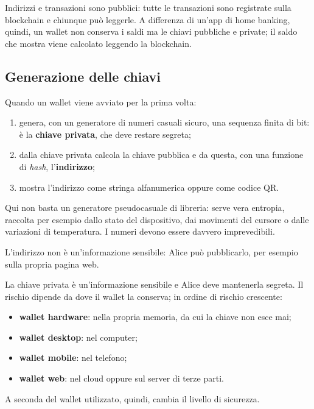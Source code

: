 \documentclass[a4paper, 11pt, oneside]{book}
\begin{document}
	Indirizzi e transazioni sono pubblici: tutte le transazioni sono registrate sulla
	blockchain e chiunque può leggerle. A differenza di un'app di home banking, quindi,
	un wallet non conserva i saldi ma le chiavi pubbliche e private; il saldo che mostra
	viene calcolato leggendo la blockchain.

	\subsection{Generazione delle chiavi}
	Quando un wallet viene avviato per la prima volta:
	\begin{enumerate}
		\item genera, con un generatore di numeri casuali sicuro, una sequenza finita di
			bit: è la \textbf{chiave privata}, che deve restare segreta;
		\item dalla chiave privata calcola la chiave pubblica e da questa, con una funzione
			di \textit{hash}, l'\textbf{indirizzo};
		\item mostra l'indirizzo come stringa alfanumerica oppure come codice QR.
	\end{enumerate}

	\begin{nota}
		Qui non basta un generatore pseudocasuale di libreria: serve vera entropia,
		raccolta per esempio dallo stato del dispositivo, dai movimenti del cursore o dalle
		variazioni di temperatura. I numeri devono essere davvero imprevedibili.
	\end{nota}

	L'indirizzo non è un'informazione sensibile: Alice può pubblicarlo, per esempio sulla
	propria pagina web.

	\begin{attenzione}
		La chiave privata è un'informazione sensibile e Alice deve mantenerla segreta.
		Il rischio dipende da dove il wallet la conserva; in ordine di rischio crescente:
		\begin{itemize}
			\item \textbf{wallet hardware}: nella propria memoria, da cui la chiave non esce
				mai;
			\item \textbf{wallet desktop}: nel computer;
			\item \textbf{wallet mobile}: nel telefono;
			\item \textbf{wallet web}: nel cloud oppure sul server di terze parti.
		\end{itemize}
	\end{attenzione}
	A seconda del wallet utilizzato, quindi, cambia il livello di sicurezza.
\end{document}
